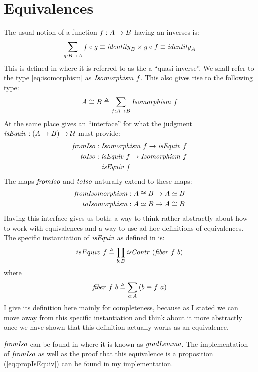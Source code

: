\section{Equivalences}
\label{sec:equiv}
The usual notion of a function $f \mathrel{:} A \to B$ having an inverses is:
%
\begin{equation}
\label{eq:isomorphism}
\sum_{g \tp B \to A} f \comp g \equiv \identity_{B} \x g \comp f \equiv \identity_{A}
\end{equation}
%
This is defined in \cite[p. 129]{hott-2013} where it is referred to as the a
``quasi-inverse''. We shall refer to the type \ref{eq:isomorphism} as
$\Isomorphism\ f$. This also gives rise to the following type:
%
\begin{equation}
A \cong B \defeq \sum_{f \tp A \to B} \Isomorphism\ f
\end{equation}
%
At the same place \cite{hott-2013} gives an ``interface'' for what the judgment
$\isEquiv \tp (A \to B) \to \MCU$ must provide:
%
\begin{align}
\var{fromIso}   & \tp \Isomorphism\ f \to \isEquiv\ f \\
\var{toIso}     & \tp \isEquiv\ f \to \Isomorphism\ f \\
\label{eq:propIsEquiv}
                &\mathrel{\ } \isEquiv\ f
\end{align}
%
The maps $\mathit{fromIso}$ and $\mathit{toIso}$ naturally extend to these maps:
%
\begin{align}
\mathit{fromIsomorphism} & \mathrel{:} A \cong B \to A \simeq B \\
\mathit{toIsomorphism}   & \mathrel{:} A \simeq B \to A \cong B
\end{align}
%
Having this interface gives us both: a way to think rather abstractly about how
to work with equivalences and a way to use ad hoc definitions of equivalences.
The specific instantiation of $\isEquiv$ as defined in \cite{cubical-agda} is:
%
$$
isEquiv\ f \defeq \prod_{b \tp B} \isContr\ (\fiber\ f\ b)
$$
where
$$
\fiber\ f\ b \defeq \sum_{a \tp A} \left( b \equiv f\ a \right)
$$
%
I give its definition here mainly for completeness, because as I stated we can
move away from this specific instantiation and think about it more abstractly
once we have shown that this definition actually works as an equivalence.

$\mathit{fromIso}$ can be found in \cite{cubical-agda} where it is known as
$\mathit{gradLemma}$. The implementation of $\mathit{fromIso}$ as well as the proof
that this equivalence is a proposition (\ref{eq:propIsEquiv}) can be found in my
implementation.

